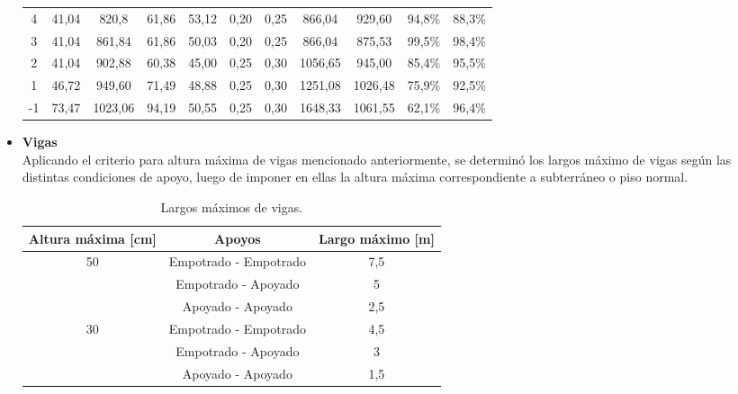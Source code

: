 \documentclass[letterpaper,11pt]{article} %
\begin{document}
\begin{itemize}
\begin{table}[H]
{\begin{tabular}{|c|cc|cc|cc|cc|cc|}
            4     & 41,04 & 820,8 & 61,86 & 53,12 & \cellcolor[rgb]{ .851,  .851,  .851}0,20 & \cellcolor[rgb]{ .682,  .667,  .667}0,25 & 866,04 & 929,60 & 94,8\% & 88,3\% \\
            3     & 41,04 & 861,84 & 61,86 & 50,03 & \cellcolor[rgb]{ .851,  .851,  .851}0,20 & \cellcolor[rgb]{ .682,  .667,  .667}0,25 & 866,04 & 875,53 & 99,5\% & 98,4\% \\
            2     & 41,04 & 902,88 & 60,38 & 45,00 & \cellcolor[rgb]{ .682,  .667,  .667}0,25 & \cellcolor[rgb]{ .502,  .502,  .502}0,30 & 1056,65 & 945,00 & 85,4\% & 95,5\% \\
            1     & 46,72 & 949,60 & 71,49 & 48,88 & \cellcolor[rgb]{ .682,  .667,  .667}0,25 & \cellcolor[rgb]{ .502,  .502,  .502}0,30 & 1251,08 & 1026,48 & 75,9\% & 92,5\% \\
            -1    & 73,47 & 1023,06 & 94,19 & 50,55 & \cellcolor[rgb]{ .682,  .667,  .667}0,25 & \cellcolor[rgb]{ .502,  .502,  .502}0,30 & 1648,33 & 1061,55 & 62,1\% & 96,4\% \bigstrut[b]\\
            \hline
            \end{tabular}%
            }
          \label{tab:addlabel}%
        \end{table}%

        
        \item \textbf{Vigas}\\
        Aplicando el criterio para altura máxima de vigas mencionado anteriormente, se determinó los largos máximo de vigas según las distintas condiciones de apoyo, luego de imponer en ellas la altura máxima correspondiente a subterráneo o piso normal.
        
        \begin{table}[htbp]
          \centering
          \caption{Largos máximos de vigas.}
                \begin{tabular}{|c|c|c|}
            \hline
            \textbf{Altura máxima [cm]} &
              \textbf{Apoyos} &
              \textbf{Largo máximo [m]}
              \bigstrut\\
            \hline
            \multirow{3}[2]{*}{50} &
              Empotrado - Empotrado &
              7,5
              \bigstrut[t]\\
             &
              Empotrado - Apoyado &
              5
              \\
             &
              Apoyado - Apoyado &
              2,5
              \bigstrut[b]\\
            \hline
            \multirow{3}[2]{*}{30} &
              Empotrado - Empotrado &
              4,5
              \bigstrut[t]\\
             &
              Empotrado - Apoyado &
              3
              \\
             &
              Apoyado - Apoyado &
              1,5
              \bigstrut[b]\\
            \hline
            \end{tabular}%
          \label{vigas}%
        \end{table}%
        

\end{itemize}
\end{document}
